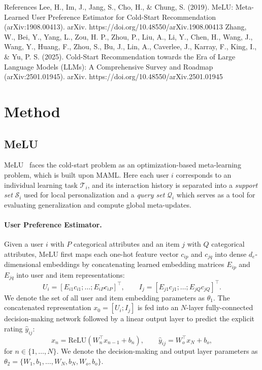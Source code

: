 \documentclass[10pt,twocolumn,letterpaper]{article}
\begin{document}
References
Lee, H., Im, J., Jang, S., Cho, H., \& Chung, S. (2019). MeLU: Meta-Learned User Preference Estimator for Cold-Start Recommendation (arXiv:1908.00413). arXiv. https://doi.org/10.48550/arXiv.1908.00413 
Zhang, W., Bei, Y., Yang, L., Zou, H. P., Zhou, P., Liu, A., Li, Y., Chen, H., Wang, J., Wang, Y., Huang, F., Zhou, S., Bu, J., Lin, A., Caverlee, J., Karray, F., King, I., \& Yu, P. S. (2025). Cold-Start Recommendation towards the Era of Large Language Models (LLMs): A Comprehensive Survey and Roadmap (arXiv:2501.01945). arXiv. https://doi.org/10.48550/arXiv.2501.01945 


\section{Method}
\label{sec:method}

\subsection{MeLU}
\label{sec:melu}
MeLU~\cite{lee2019melu} faces the cold-start problem as an optimization-based meta-learning problem, which is built upon MAML. Here each user $i$ corresponds to an individual learning task $\mathcal{T}_i$, and its interaction history is separated into a \emph{support set} $\mathcal{S}_i$ used for local personalization and a \emph{query set} $\mathcal{Q}_i$ which serves as a tool for evaluating generalization and compute global meta-updates.

\paragraph{User Preference Estimator.}
Given a user $i$ with $P$ categorical attributes and an item $j$ with $Q$ categorical attributes, MeLU first maps each one-hot feature vector $c_{ip}$ and $c_{jq}$ into dense $d_e$-dimensional embeddings by concatenating learned embedding matrices $E_{ip}$ and $E_{jq}$ into user and item representations:
\begin{equation}
    U_i = [E_{i1}c_{i1}; \dots; E_{iP}c_{iP}]^\top, \qquad
    I_j = [E_{j1}c_{j1}; \dots; E_{jQ}c_{jQ}]^\top.
\end{equation}
We denote the set of all user and item embedding parameters as $\theta_1$. The concatenated representation $x_0 = [U_i; I_j]$ is fed into an $N$-layer fully-connected decision-making network followed by a linear output layer to predict the explicit rating $\hat{y}_{ij}$:
\begin{equation}
    x_n = \mathrm{ReLU}(W_n^\top x_{n-1} + b_n), \qquad
    \hat{y}_{ij} = W_o^\top x_N + b_o,
\end{equation}
for $n \in \{1, \dots, N\}$. We denote the decision-making and output layer parameters as $\theta_2 = \{W_1, b_1, \dots, W_N, b_N, W_o, b_o\}$.
\end{document}
